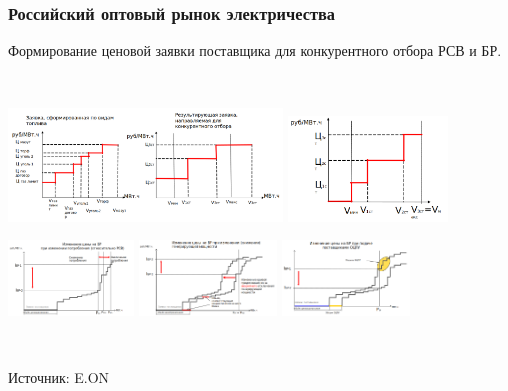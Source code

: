\documentclass[c, dvipsnames]{beamer}  %
\begin{document}
\begin{frame}[shrink=5]
\frametitle{Российский оптовый рынок электричества} 




Формирование ценовой заявки поставщика 	для конкурентного отбора  РСВ и БР. 

\

\vfil
\hfil\hfil\includegraphics[height=3cm]{screenshot016}\hfil\hfil
\includegraphics[height=2.8cm]{screenshot017}\newline

\vfil
\hfil\hfil\includegraphics[height=2cm]{screenshot018}\hfil\hfil
\includegraphics[height=2cm]{screenshot019}
\hfil\hfil\includegraphics[height=2cm]{screenshot020}\newline

\

Источник: E.ON

\end{frame}
\end{document}
